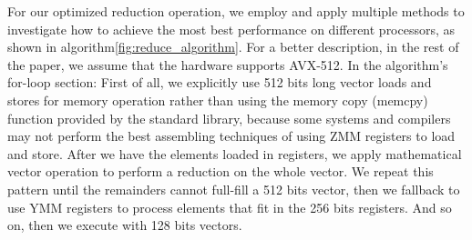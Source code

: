 \documentclass[sigconf]{acmart}
\begin{document}
%
For our optimized reduction operation, we employ and apply multiple
methods to investigate how to achieve the
most best performance on different processors, as shown in algorithm\ref{fig:reduce_algorithm}.
For a better description, in the rest of the paper, we assume that the hardware supports AVX-512.
In the algorithm's for-loop section: First of all, we explicitly use 512 bits long vector loads and stores for memory operation rather than using the memory copy (memcpy) function provided by
the standard library, because some systems and compilers may not perform
the best assembling techniques of using ZMM registers to load and store.
%
After we have the elements loaded in registers, we apply mathematical vector operation
to perform a reduction on the whole vector.
We repeat this pattern until the remainders cannot full-fill a 512 bits vector,
then we fallback to use YMM registers to process elements that fit in the 256 bits registers.
And so on, then we execute with 128 bits vectors.
\end{document}
